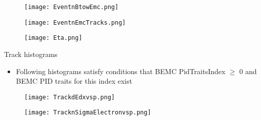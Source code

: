 \documentclass{beamer}
\begin{document}
\begin{frame}
	\begin{figure}[h!]
		\centering
		\texttt{[image: EventnBtowEmc.png]}
	\end{figure}
\end{frame}

\begin{frame}
	\begin{figure}[h!]
		\centering
		\texttt{[image: EventnEmcTracks.png]}
	\end{figure}
\end{frame}


\begin{frame}
	\begin{figure}[h!]
		\centering
		\texttt{[image: Eta.png]}
	\end{figure}
\end{frame}

\begin{frame}
  \begin{center}
 	\Huge Track histograms
 	\end{center}
\end{frame}

\begin{frame}
  \begin{itemize}
  \item Following histograms satisfy conditions that BEMC PidTraitsIndex $\geq$ 0 and BEMC PID traits for this index exist
  \end{itemize}
\end{frame}

\begin{frame}
  \begin{figure}[h!]
  \centering
  \texttt{[image: TrackdEdxvsp.png]}
  \end{figure}
\end{frame}

\begin{frame}
  \begin{figure}[h!]
  \centering
  \texttt{[image: TracknSigmaElectronvsp.png]}
  \end{figure}
\end{frame}
\end{document}
